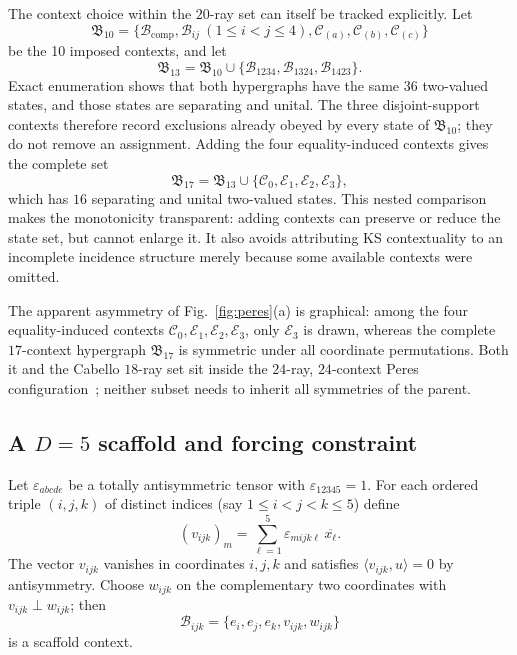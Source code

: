\documentclass[%
  reprint,
  superscriptaddress,
  showkeys,
  amsmath,amssymb,
  aps,pra,
  longbibliography,
  floatfix,
  x11names
]{revtex4-2}
\begin{document}
The context choice within the $20$-ray set can itself be tracked explicitly.  Let
\[
\mathfrak{B}_{10}=\{\mathcal{B}_{\mathrm{comp}},\mathcal{B}_{ij}\ (1\leq i<j\leq4),
\mathcal{C}_{(a)},\mathcal{C}_{(b)},\mathcal{C}_{(c)}\}
\]
be the 10 imposed contexts, and let
\[
\mathfrak{B}_{13}=\mathfrak{B}_{10}\cup
\{\mathcal{B}_{1234},\mathcal{B}_{1324},\mathcal{B}_{1423}\}.
\]
Exact enumeration shows that both hypergraphs have the same $36$ two-valued states, and those states are separating and unital.  The three disjoint-support contexts therefore record exclusions already obeyed by every state of $\mathfrak{B}_{10}$; they do not remove an assignment.  Adding the four equality-induced contexts gives the complete set
\[
\mathfrak{B}_{17}=\mathfrak{B}_{13}\cup\{\mathcal{C}_0,\mathcal{E}_1,\mathcal{E}_2,\mathcal{E}_3\},
\]
which has $16$ separating and unital two-valued states.  This nested comparison makes the monotonicity transparent: adding contexts can preserve or reduce the state set, but cannot enlarge it.  It also avoids attributing KS contextuality to an incomplete incidence structure merely because some available contexts were omitted.

The apparent asymmetry of Fig.~\ref{fig:peres}(a) is graphical: among the four equality-induced contexts $\mathcal{C}_0,\mathcal{E}_1,\mathcal{E}_2,\mathcal{E}_3$, only $\mathcal{E}_3$ is drawn, whereas the complete $17$-context hypergraph $\mathfrak{B}_{17}$ is symmetric under all coordinate permutations.  Both it and the Cabello $18$-ray set sit inside the $24$-ray, $24$-context Peres configuration~\cite{Pavicic-2005,pavicic-2005csvcorri}; neither subset needs to
inherit all symmetries of the parent.


\subsection{A \texorpdfstring{$D=5$}{D=5} scaffold and forcing constraint}

Let $\varepsilon_{abcde}$ be a totally antisymmetric tensor
with $\varepsilon_{12345}=1$.  For each ordered triple $(i,j,k)$ of distinct indices (say $1\le i<j<k\le 5$) define
\[
(v_{ijk})_m=\sum_{\ell=1}^5\varepsilon_{mijk\ell}\,\overline{x_\ell}.
\]
The vector $v_{ijk}$ vanishes in coordinates $i,j,k$ and satisfies $\langle v_{ijk},u\rangle=0$ by antisymmetry.  Choose $w_{ijk}$ on the complementary two coordinates with $v_{ijk}\perp w_{ijk}$; then
\[
\mathcal{B}_{ijk}=\{e_i,e_j,e_k,v_{ijk},w_{ijk}\}
\]
is a scaffold context.
\end{document}
